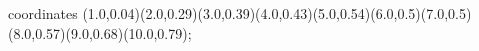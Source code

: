 					coordinates { (1.0,0.04)(2.0,0.29)(3.0,0.39)(4.0,0.43)(5.0,0.54)(6.0,0.5)(7.0,0.5)(8.0,0.57)(9.0,0.68)(10.0,0.79)};
